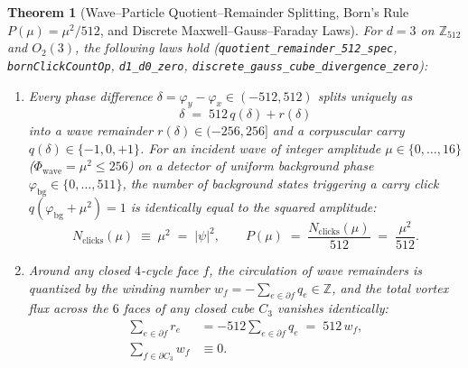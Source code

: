 \documentclass[11pt,a4paper]{article}
\theoremstyle{plain}
\newtheorem{theorem}{Theorem}[section]
\theoremstyle{definition}
\begin{document}
\begin{theorem}[Wave--Particle Quotient--Remainder Splitting, Born's Rule $P(\mu)=\mu^2/512$, and Discrete Maxwell--Gauss--Faraday Laws]
\label{thm:born-maxwell}
For $d=3$ on $\mathbb{Z}_{512}$ and $O_2(3)$, the following laws hold (\texttt{quotient\_remainder\_512\_spec}, \texttt{bornClickCountOp}, \texttt{d1\_d0\_zero}, \texttt{discrete\_gauss\_cube\_divergence\_zero}):
\begin{enumerate}[label=\textbf{(\arabic*)},leftmargin=*]
\item Every phase difference $\delta = \varphi_y - \varphi_x \in (-512, 512)$ splits uniquely as
  \begin{equation}
    \label{eq:phase-qr-split}
    \delta \;=\; 512\,q(\delta) + r(\delta)
  \end{equation}
  into a wave remainder $r(\delta) \in (-256, 256]$ and a corpuscular carry $q(\delta) \in \{-1, 0, +1\}$. For an incident wave of integer amplitude $\mu \in \{0, \dots, 16\}$ ($\Phi_{\mathrm{wave}} = \mu^2 \le 256$) on a detector of uniform background phase $\varphi_{\mathrm{bg}} \in \{0, \dots, 511\}$, the number of background states triggering a carry click $q(\varphi_{\mathrm{bg}} + \mu^2) = 1$ is identically equal to the squared amplitude:
  \begin{equation}
    \label{eq:born-rule-exact}
    N_{\mathrm{clicks}}(\mu) \;\equiv\; \mu^2 \;=\; |\psi|^2,
    \qquad
    P(\mu) \;=\; \frac{N_{\mathrm{clicks}}(\mu)}{512} \;=\; \frac{\mu^2}{512}.
  \end{equation}
\item Around any closed $4$-cycle face $f$, the circulation of wave remainders is quantized by the winding number $w_f = -\sum_{e\in\partial f} q_e \in \mathbb{Z}$, and the total vortex flux across the $6$ faces of any closed cube $C_3$ vanishes identically:
  \begin{align}
    \sum_{e\in\partial f} r_e &= -512\sum_{e\in\partial f} q_e \;=\; 512\,w_f, \label{eq:maxwell-faraday-circulation} \\
    \sum_{f\in\partial C_3} w_f &\equiv 0. \label{eq:maxwell-gauss-monopole-free}
  \end{align}
\end{enumerate}
\end{theorem}
\end{document}
